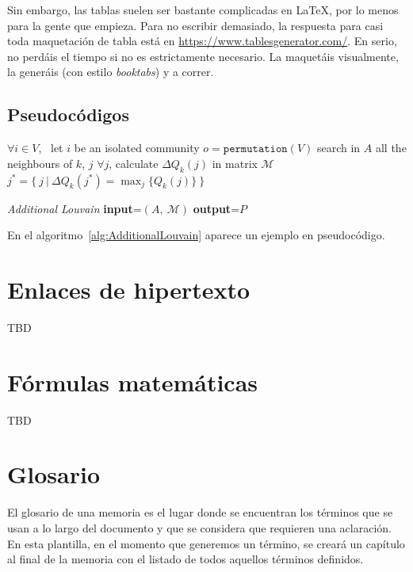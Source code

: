 Sin embargo, las tablas suelen ser bastante complicadas en \LaTeX, por lo menos para la gente que empieza. Para no escribir demasiado, la respuesta para casi toda maquetación de tabla está en \href{https://www.tablesgenerator.com/}{https://www.tablesgenerator.com/}. En serio, no perdáis el tiempo si no es estrictamente necesario. La maquetáis visualmente, la generáis (con estilo \textit{booktabs}) y a correr.

\subsection{Pseudocódigos}


\begin{algorithm}
\begin{algorithmic}[1]
\STATE $\forall i \in V$, \ let $i$ be an isolated community
\STATE $o=\texttt{permutation}(V)$
\STATE search in $A$ all the neighbours of $k$, $j$
\STATE $\forall j$, calculate $\Delta Q_k(j)$ in matrix $\mathcal{M}$
\STATE $j^*=\{ \ j \ | \ \Delta Q_k(j^*)=\max_j\{Q_k(j)\} \ \}$
\ELSE
{}
\ENDIF
\ENDFOR
\end{algorithmic}\caption{\textit{Additional Louvain} \textbf{input}=$\left(A, \ \mathcal{M}\right)$ \textbf{output}=$P$}
\label{alg:AdditionalLouvain}
\end{algorithm}

En el algoritmo~\ref{alg:AdditionalLouvain} aparece un ejemplo en pseudocódigo.

\section{Enlaces de hipertexto}

TBD

\section{Fórmulas matemáticas}

TBD

\section{Glosario}
\label{s:glosario}

El glosario de una memoria es el lugar donde se encuentran los términos que se usan a lo largo del documento y que se considera que requieren una aclaración. En esta plantilla, en el momento que generemos un término, se creará un capítulo al final de la memoria con el listado de todos aquellos términos definidos.

